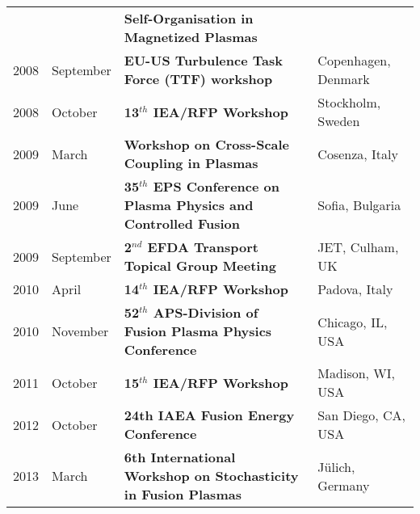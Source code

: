\begin{longtable}{llll}
& & \textbf{Self-Organisation in Magnetized Plasmas} & \\
2008 & September & \textbf{EU-US Turbulence Task Force (TTF) workshop}
& Copenhagen, Denmark \\
2008 & October & \textbf{13$^{th}$ IEA/RFP Workshop} & Stockholm,
Sweden \\
2009 & March & \textbf{Workshop on Cross-Scale Coupling in Plasmas} &
Cosenza, Italy  \\
2009 & June & \textbf{35$^{th}$ EPS Conference on Plasma Physics and
  Controlled Fusion} & Sofia, Bulgaria \\
2009 & September & \textbf{2$^{nd}$ EFDA Transport Topical Group
  Meeting} & JET, Culham, UK \\
2010 & April & \textbf{14$^{th}$ IEA/RFP Workshop} & Padova, Italy \\
2010 & November & \textbf{52$^{th}$ APS-Division of Fusion Plasma
  Physics Conference} & Chicago, IL, USA \\
2011 & October & \textbf{15$^{th}$ IEA/RFP Workshop} & Madison, WI,
USA \\
2012 & October & \textbf{24th IAEA Fusion Energy Conference} & San
Diego, CA, USA\\
2013 & March & \textbf{6th International Workshop on Stochasticity in
  Fusion Plasmas} & J{\"u}lich, Germany
\end{longtable}
